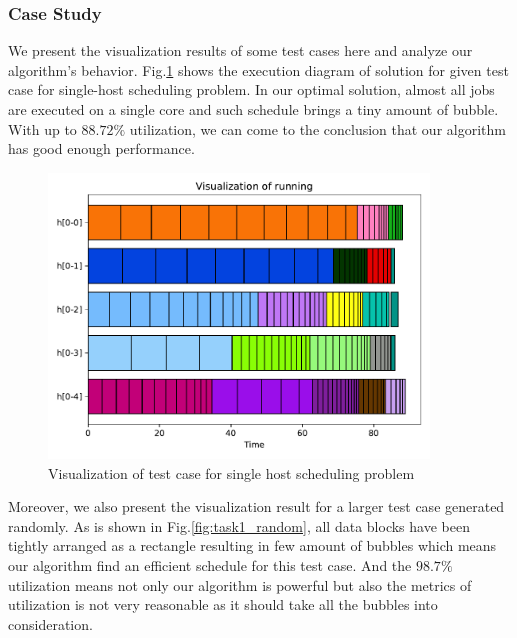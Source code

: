\documentclass{llncs}
\begin{document}
\subsubsection*{Case Study}
We present the visualization results of some test cases here and analyze our algorithm's behavior. Fig.\ref{fig:task1} shows the execution diagram of solution for given test case for single-host scheduling problem. In our optimal solution, almost all jobs are executed on a single core and such schedule brings a tiny amount of bubble. With up to $88.72\%$ utilization, we can come to the conclusion that our algorithm has good enough performance.

\begin{figure}[t]
    \centering
    \includegraphics[width=0.9\textwidth]{task1.pdf}
    \caption{Visualization of test case for single host scheduling problem}
    \label{fig:task1}
\end{figure}

Moreover, we also present the visualization result for a larger test case generated randomly. As is shown in Fig.\ref{fig:task1_random}, all data blocks have been tightly arranged as a rectangle resulting in few amount of bubbles which means our algorithm find an efficient schedule for this test case. And the $98.7\%$ utilization means not only our algorithm is powerful but also the metrics of utilization is not very reasonable as it should take all the bubbles into consideration.
\end{document}
